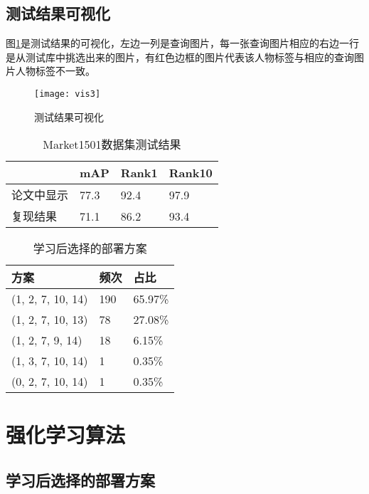 \subsection{测试结果可视化}

图\ref{fig:testvis}是测试结果的可视化，左边一列是查询图片，每一张查询图片相应的右边一行是从测试库中挑选出来的图片，有红色边框的图片代表该人物标签与相应的查询图片人物标签不一致。

\begin{figure}
\centering
\texttt{[image: vis3]}
\caption{测试结果可视化}
\label{fig:testvis}
\end{figure}

\begin{table}[h!]
    \centering
    \caption{Market1501数据集测试结果}
    \label{tab:test}
    \begin{tabularx}{\textwidth}{XXXX}
    \toprule
               & mAP   & Rank1 & Rank10 \\ \midrule
    论文中显示  & 77.3  & 92.4  & 97.9   \\
    复现结果    & 71.1  & 86.2  & 93.4   \\ \bottomrule
    \end{tabularx}
\end{table}

\begin{table}[h!]
    \centering
    \caption{学习后选择的部署方案}
    \label{tab:rlresult}
    \begin{tabularx}{\textwidth}{XXX}
    \toprule
    方案               & 频次  & 占比      \\ \midrule
    (1, 2, 7, 10, 14) & 190 & 65.97\% \\
    (1, 2, 7, 10, 13) & 78  & 27.08\% \\
    (1, 2, 7, 9, 14)  & 18  & 6.15\%  \\
    (1, 3, 7, 10, 14) & 1   & 0.35\%  \\
    (0, 2, 7, 10, 14) & 1   & 0.35\%  \\ \bottomrule
    \end{tabularx}
\end{table}

\section{强化学习算法}

\subsection{学习后选择的部署方案}

